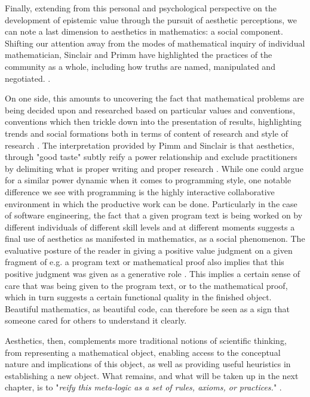 Finally, extending from this personal and psychological perspective on the development of epistemic value through the pursuit of aesthetic perceptions, we can note a last dimension to aesthetics in mathematics: a social component. Shifting our attention away from the modes of mathematical inquiry of individual mathematician, Sinclair and Primm have highlighted the practices of the community as a whole, including how truths are named, manipulated and negotiated. \citep{sinclair_aesthetic_2011}.

On one side, this amounts to uncovering the fact that mathematical problems are being decided upon and researched based on particular values and conventions, conventions which then trickle down into the presentation of results, highlighting trends and social formations both in terms of content of research and style of research \citep{depaz_stylistique_2023}. The interpretation provided by Pimm and Sinclair is that aesthetics, through "good taste" subtly reify a power relationship and exclude practitioners by delimiting what is proper writing and proper research \citep{sinclair_many_2010}. While one could argue for a similar power dynamic when it comes to programming style, one notable difference we see with programming is the highly interactive collaborative environment in which the productive work can be done. Particularly in the case of software engineering, the fact that a given program text is being worked on by different individuals of different skill levels and at different moments suggests a final use of aesthetics as manifested in mathematics, as a social phenomenon. The evaluative posture of the reader in giving a positive value judgment on a given fragment of e.g. a program text or mathematical proof also implies that this positive judgment was given as a generative role \citep{tomov_role_2016a}. This implies a certain sense of care that was being given to the program text, or to the mathematical proof, which in turn suggests a certain functional quality in the finished object. Beautiful mathematics, as beautiful code, can therefore be seen as a sign that someone cared for others to understand it clearly.

Aesthetics, then, complements more traditional notions of scientific thinking, from representing a mathematical object, enabling access to the conceptual nature and implications of this object, as well as providing useful heuristics in establishing a new object. What remains, and what will be taken up in the next chapter, is to "\emph{reify this meta-logic as a set of rules, axioms, or practices.}" \citep{root-bernstein_aesthetic_2002}.

